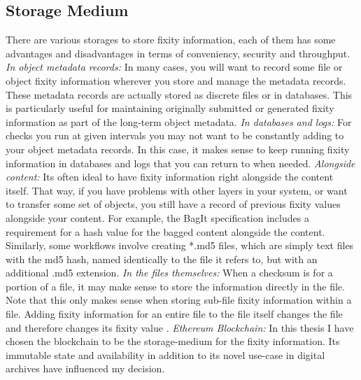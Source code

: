 \subsection{Storage Medium}
\label{sec:storage-medium}
There are various storages to store fixity information, each of them has some advantages and disadvantages in terms of conveniency, security and throughput.
\newline \textit{In object metadata records:} In many cases, you will want to record some file or object fixity information wherever you store and manage the metadata records. These metadata records are actually stored as discrete files or in databases. This is particularly useful for maintaining originally submitted or generated fixity information as part of the long-term object metadata. 
\newline \textit{In databases and logs:} For checks you run at given intervals you may not want to be constantly adding to your object metadata records. In this case, it makes sense to keep running fixity information in databases and logs that you can return to when needed.
\newline \textit{Alongside content:} Its often ideal to have fixity information right alongside the content itself. That way, if you have problems with other layers in your system, or want to transfer some set of objects, you still have a record of previous fixity values alongside your content. For example, the BagIt specification includes a requirement for a hash value for the bagged content alongside the content. Similarly, some workflows involve creating *.md5 files, which are simply text files with the md5 hash, named identically to the file it refers to, but with an additional .md5 extension.
\newline \textit{In the files themselves:} When a checksum is for a portion of a file, it may make sense to store the information directly in the file. Note that this only makes sense when storing sub-file fixity information within a file. Adding fixity information for an entire file to the file itself changes the file and therefore changes its fixity value \cite[7]{ndsa2014fixity}.
\newline \textit{Ethereum Blockchain:} In this thesis I have chosen the blockchain to be the storage-medium for the fixity information. Its immutable state and availability in addition to its novel use-case in digital archives have influenced my decision.
